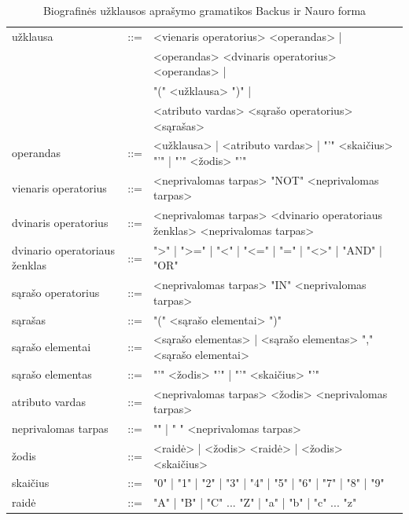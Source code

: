 \begin{table}[H]\footnotesize
	\centering
	\begin{tabular}{|l c l|}
		\hline
		užklausa                      & ::= & <vienaris operatorius> <operandas> | \\
									  &     & \multicolumn{1}{l|}{<operandas> <dvinaris operatorius> <operandas> |} \\
									  &     & \multicolumn{1}{l|}{"(" <užklausa> ")" |} \\
									  &     & \multicolumn{1}{l|}{ <atributo vardas> <sąrašo operatorius> <sąrašas>} \\
		operandas                     & ::= & <užklausa> | <atributo vardas> | "'" <skaičius> "'" | "'" <žodis> "'" \\
		vienaris operatorius          & ::= & <neprivalomas tarpas> "NOT" <neprivalomas tarpas> \\
		dvinaris operatorius          & ::= & <neprivalomas tarpas> <dvinario operatoriaus ženklas> <neprivalomas tarpas> \\
		dvinario operatoriaus ženklas & ::= & ">" | ">=" | "<" | "<=" | "=" | "<>" | "AND" | "OR" \\
		sąrašo operatorius            & ::= & <neprivalomas tarpas> "IN" <neprivalomas tarpas> \\
		sąrašas                       & ::= & "(" <sąrašo elementai> ")" \\
		sąrašo elementai              & ::= & <sąrašo elementas> | <sąrašo elementas> "," <sąrašo elementai> \\
		sąrašo elementas              & ::= & "'" <žodis> "'" | "'" <skaičius> "'" \\
		atributo vardas               & ::= & <neprivalomas tarpas> <žodis> <neprivalomas tarpas> \\
		neprivalomas tarpas           & ::= & "" | " " <neprivalomas tarpas> \\
		žodis                         & ::= & <raidė> | <žodis> <raidė> | <žodis> <skaičius> \\
		skaičius                      & ::= & "0" | "1" | "2" | "3" | "4" | "5" | "6" | "7" | "8" | "9" \\
		raidė                         & ::= & "A" | "B" | "C" ... "Z" | "a" | "b" | "c" ... "z"  \\
		\hline
	\end{tabular}
	\caption{Biografinės užklausos aprašymo gramatikos Backus ir Nauro forma}
	\label{tab:queryBNF}
\end{table}

